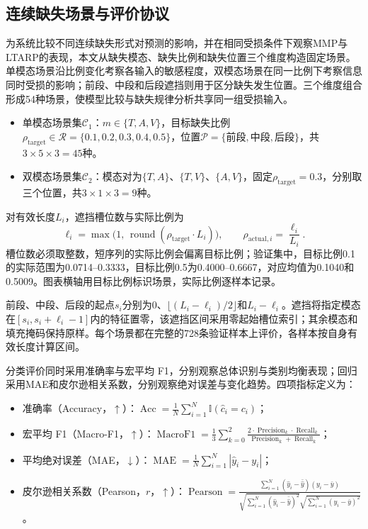 \documentclass[UTF8,a4paper,11pt]{ctexart}
\newcommand{\QTwoParagraph}{\par\noindent\hspace*{2em}}
\newcounter{q2algorithm}
\begin{document}
\subsection{连续缺失场景与评价协议}\label{subsec:q2_benchmark}
\QTwoParagraph 为系统比较不同连续缺失形式对预测的影响，并在相同受损条件下观察MMP与LTARP的表现，本文从缺失模态、缺失比例和缺失位置三个维度构造固定场景。单模态场景沿比例变化考察各输入的敏感程度，双模态场景在同一比例下考察信息同时受损的影响；前段、中段和后段遮挡则用于区分缺失发生位置。三个维度组合形成54种场景，使模型比较与缺失规律分析共享同一组受损输入。

\begin{itemize}[leftmargin=2.5em,itemsep=0pt,topsep=2pt]
\item 单模态场景集$\mathcal C_1$：$m\in\{T,A,V\}$，目标缺失比例$\rho_{\mathrm{target}}\in\mathcal R=\{0.1,0.2,0.3,0.4,0.5\}$，位置$\mathcal P=\{\text{前段},\text{中段},\text{后段}\}$，共$3\times5\times3=45$种。
\item 双模态场景集$\mathcal C_2$：模态对为$\{T,A\}$、$\{T,V\}$、$\{A,V\}$，固定$\rho_{\mathrm{target}}=0.3$，分别取三个位置，共$3\times1\times3=9$种。
\end{itemize}

\QTwoParagraph 对有效长度$L_i$，遮挡槽位数与实际比例为
\begin{equation}
\ell_i = \max\big(1,\, \operatorname{round}(\rho_{\mathrm{target}} \cdot L_i)\big),\qquad
\rho_{\mathrm{actual}, i} = \frac{\ell_i}{L_i}.
\label{eq:q2_mask_len}
\end{equation}
槽位数必须取整数，短序列的实际比例会偏离目标比例；验证集中，目标比例0.1的实际范围为0.0714--0.3333，目标比例0.5为0.4000--0.6667，对应均值为0.1040和0.5009。图表横轴用目标比例标识场景，实际比例逐样本记录。

\QTwoParagraph 前段、中段、后段的起点$s_i$分别为$0$、$\lfloor(L_i-\ell_i)/2\rfloor$和$L_i-\ell_i$。遮挡将指定模态在$[s_i,s_i+\ell_i-1]$内的特征置零，该遮挡区间采用零起始槽位索引；其余模态和填充掩码保持原样。每个场景都在完整的728条验证样本上评价，各样本按自身有效长度计算区间。

\QTwoParagraph 分类评价同时采用准确率与宏平均 F1，分别观察总体识别与类别均衡表现；回归采用MAE和皮尔逊相关系数，分别观察绝对误差与变化趋势。四项指标定义为：
\begin{itemize}[leftmargin=2.5em,itemsep=0pt,topsep=2pt]
  \item 准确率（Accuracy，$\uparrow$）：$\operatorname{Acc} = \frac{1}{N}\sum_{i=1}^N \mathbb I(\hat c_i = c_i)$；
  \item 宏平均 F1（Macro-F1，$\uparrow$）：$\operatorname{MacroF1} = \frac{1}{3}\sum_{k=0}^2 \frac{2 \cdot \operatorname{Precision}_k \cdot \operatorname{Recall}_k}{\operatorname{Precision}_k + \operatorname{Recall}_k}$；
  \item 平均绝对误差（MAE，$\downarrow$）：$\operatorname{MAE} = \frac{1}{N}\sum_{i=1}^N |\hat y_i - y_i|$；
  \item 皮尔逊相关系数（Pearson，$r$，$\uparrow$）：$\operatorname{Pearson} = \frac{\sum_{i=1}^N (\hat y_i - \bar{\hat y})(y_i - \bar y)}{\sqrt{\sum_{i=1}^N (\hat y_i - \bar{\hat y})^2}\sqrt{\sum_{i=1}^N (y_i - \bar y)^2}}$。
\end{itemize}
\end{document}
